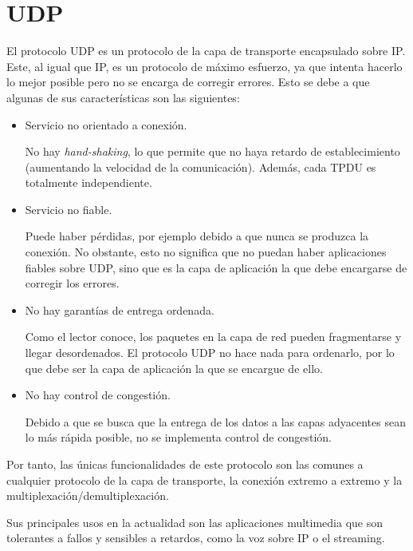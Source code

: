 \section{\acrfull{UDP}}
El protocolo \acrshort{UDP} es un protocolo de la capa de transporte encapsulado sobre \acrshort{IP}.
Este, al igual que \acrshort{IP}, es un protocolo de máximo esfuerzo, ya que intenta hacerlo lo mejor posible pero no se encarga de corregir errores. Esto se debe a que algunas de sus características son las siguientes:
\begin{itemize}
    \item Servicio no orientado a conexión.
    
    No hay \textit{hand-shaking}, lo que permite que no haya retardo de establecimiento (aumentando la velocidad de la comunicación). Además, cada \acrshort{TPDU} es totalmente independiente.

    \item Servicio no fiable.
    
    Puede haber pérdidas, por ejemplo debido a que nunca se produzca la conexión. No obstante, esto no significa que no puedan haber aplicaciones fiables sobre \acrshort{UDP}, sino que es la capa de aplicación la que debe encargarse de corregir los errores.

    \item No hay garantías de entrega ordenada.
    
    Como el lector conoce, los paquetes en la capa de red pueden fragmentarse y llegar desordenados. El protocolo \acrshort{UDP} no hace nada para ordenarlo, por lo que debe ser la capa de aplicación la que se encargue de ello.

    \item No hay control de congestión.
    
    Debido a que se busca que la entrega de los datos a las capas adyacentes sean lo más rápida posible, no se implementa control de congestión.
\end{itemize}

Por tanto, las únicas funcionalidades de este protocolo son las comunes a cualquier protocolo de la capa de transporte, la conexión extremo a extremo y la multiplexación/demultiplexación.

Sus principales usos en la actualidad son las aplicaciones multimedia que son tolerantes a fallos y sensibles a retardos, como la voz sobre IP o el streaming.

